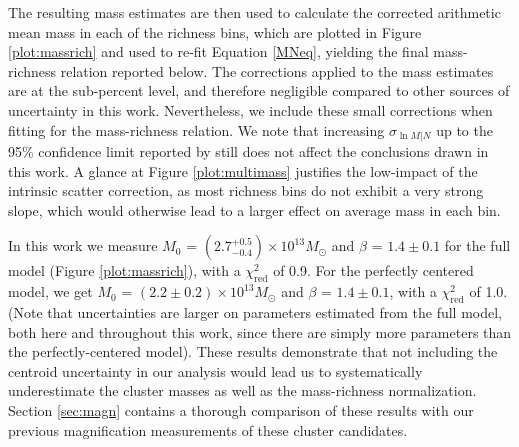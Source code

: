 The resulting mass estimates are then used to calculate the corrected arithmetic mean mass in each of the richness bins, which are plotted in Figure \ref{plot:massrich} and used to re-fit Equation \ref{MNeq}, yielding the final mass-richness relation reported below. The corrections applied to the mass estimates are at the sub-percent level, and therefore negligible compared to other sources of uncertainty in this work. Nevertheless, we include these small corrections when fitting for the mass-richness relation. We note that increasing $\sigma_{\ln M|N}$ up to the 95\% confidence limit reported by \citet{Rozo09a} still does not affect the conclusions drawn in this work. A glance at Figure \ref{plot:multimass} justifies the low-impact of the intrinsic scatter correction, as most richness bins do not exhibit a very strong slope, which would otherwise lead to a larger effect on average mass in each bin.

In this work we measure $M_0$ = $(2.7^{+0.5}_{-0.4}) \times 10^{13} M_{\odot}$ and $\beta$ = $1.4 \pm 0.1$ for the full model (Figure \ref{plot:massrich}), with a $\chi^2_{\mathrm{red}}$ of 0.9. For the perfectly centered model, we get $M_0$ = $(2.2 \pm 0.2) \times 10^{13} M_{\odot}$ and $\beta$ = $1.4 \pm 0.1$, with a $\chi^2_{\mathrm{red}}$ of 1.0. (Note that uncertainties are larger on parameters estimated from the full model, both here and throughout this work, since there are simply more parameters than the perfectly-centered model). These results demonstrate that not including the centroid uncertainty in our analysis would lead us to systematically underestimate the cluster masses as well as the mass-richness normalization. Section \ref{sec:magn} contains a thorough comparison of these results with our previous magnification measurements of these cluster candidates.



